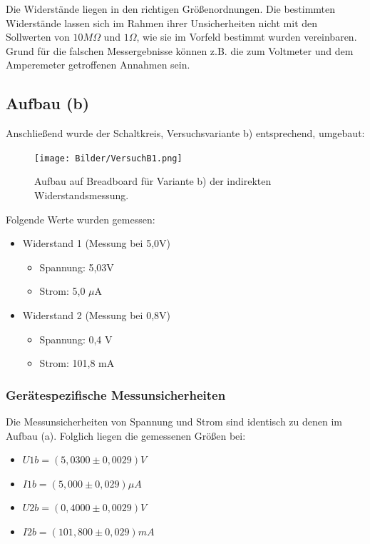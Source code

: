 \documentclass[
  9pt,
]{article}
\begin{document}
Die Widerstände liegen in den richtigen Größenordnungen. Die bestimmten
Widerstände lassen sich im Rahmen ihrer Unsicherheiten nicht mit den
Sollwerten von \(10M\Omega\) und \(1\Omega\), wie sie im Vorfeld
bestimmt wurden vereinbaren. Grund für die falschen Messergebnisse
können z.B. die zum Voltmeter und dem Amperemeter getroffenen Annahmen
sein.

\hypertarget{aufbau-b}{%
\subsection{Aufbau (b)}\label{aufbau-b}}

Anschließend wurde der Schaltkreis, Versuchsvariante b) entsprechend,
umgebaut:

\begin{figure}
\centering
\texttt{[image: Bilder/VersuchB1.png]}
\caption{Aufbau auf Breadboard für Variante b) der indirekten
Widerstandsmessung.}
\end{figure}

Folgende Werte wurden gemessen:

\begin{itemize}
\item {Widerstand 1 (Messung bei 5,0V)}
\begin{itemize}
\item {Spannung: 5,03V}
\item {Strom: 5,0 $\mu$A}
\end{itemize}
\item {Widerstand 2 (Messung bei 0,8V)}
\begin{itemize}
\item {Spannung: 0,4 V}
\item {Strom: 101,8 mA}
\end{itemize}
\end{itemize}

\hypertarget{geruxe4tespezifische-messunsicherheiten-1}{%
\subsubsection{Gerätespezifische
Messunsicherheiten}\label{geruxe4tespezifische-messunsicherheiten-1}}

Die Messunsicherheiten von Spannung und Strom sind identisch zu denen im
Aufbau (a). Folglich liegen die gemessenen Größen bei:

\begin{itemize}
\item $U1b = (5,0300 \pm 0,0029)V$
\item $I1b = (5,000 \pm 0,029) \mu A$
\item $U2b = (0,4000 \pm 0,0029)V$
\item $I2b = (101,800 \pm 0,029) mA$
\end{itemize}
\end{document}
